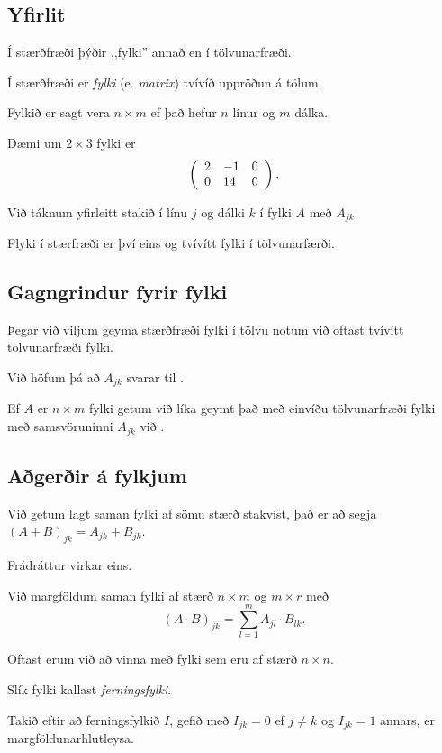 \subsection{Yfirlit}
{
    {
        \item<1-> Í stærðfræði þýðir ,,fylki'' annað en í tölvunarfræði.
        \item<2-> Í stærðfræði er \emph{fylki} (e. \emph{matrix}) tvívíð uppröðun á tölum.
        \item<3-> Fylkið er sagt vera $n \times m$ ef það hefur $n$ línur og $m$ dálka.
        \item<4-> Dæmi um $2 \times 3$ fylki er
        \[
            \left (
            \env{array}
            { {l l l}
                2 & -1 & 0\\
                0 & 14 & 0
            }
            \right ).
        \]
        \item<5-> Við táknum yfirleitt stakið í línu $j$ og dálki $k$ í fylki $A$ með $A_{jk}$.
        \item<6-> Flyki í stærfræði er því eins og tvívítt fylki í tölvunarfærði.
    }
}

\subsection{Gagngrindur fyrir fylki}
{
    {
        \item<1-> Þegar við viljum geyma stærðfræði fylki í tölvu notum við oftast tvívítt tölvunarfræði fylki.
        \item<2-> Við höfum þá að $A_{jk}$ svarar til .
        \item<3-> Ef $A$ er $n \times m$ fylki getum við líka geymt það með einvíðu tölvunarfræði fylki með samsvöruninni $A_{jk}$ við
                    .
    }
}

\subsection{Aðgerðir á fylkjum}
{
    {
        \item<1-> Við getum lagt saman fylki af sömu stærð stakvíst, það er að segja $(A + B)_{jk} = A_{jk} + B_{jk}$.
        \item<2-> Frádráttur virkar eins.
        \item<3-> Við margföldum saman fylki af stærð $n \times m$ og $m \times r$ með
        \[
            (A \cdot B)_{jk} = \sum_{l = 1}^m A_{jl} \cdot B_{lk}.
        \]
        \item<4-> Oftast erum við að vinna með fylki sem eru af stærð $n \times n$.
        \item<5-> Slík fylki kallast \emph{ferningsfylki}.
        \item<6-> Takið eftir að ferningsfylkið $I$, gefið með $I_{jk} = 0$ ef $j \neq k$ og $I_{jk} = 1$ annars, er margföldunarhlutleysa.
    }
}

